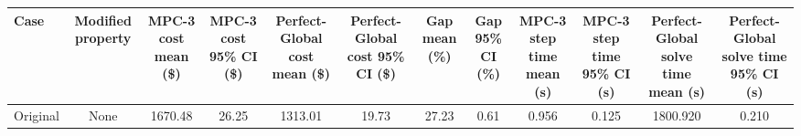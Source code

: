 \begin{tabular}{lccccccccccc}
\toprule
Case & Modified property & MPC-3 cost mean (\$) & MPC-3 cost 95\% CI (\$) & Perfect-Global cost mean (\$) & Perfect-Global cost 95\% CI (\$) & Gap mean (\%) & Gap 95\% CI (\%) & MPC-3 step time mean (s) & MPC-3 step time 95\% CI (s) & Perfect-Global solve time mean (s) & Perfect-Global solve time 95\% CI (s) \\
\midrule
Original & None & 1670.48 & 26.25 & 1313.01 & 19.73 & 27.23 & 0.61 & 0.956 & 0.125 & 1800.920 & 0.210 \\
\bottomrule
\end{tabular}
